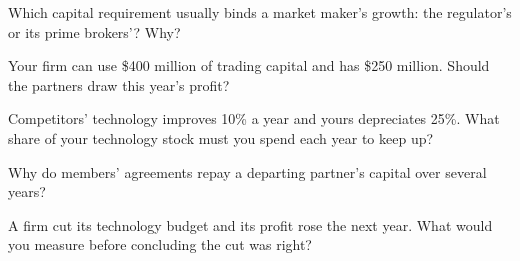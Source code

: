 \begin{interviewq}\label{iq:fm:the-proprietary-market-making-firm:2}
Which capital requirement usually binds a market maker's growth: the regulator's or its prime brokers'? Why?
\end{interviewq}

\begin{interviewq}\label{iq:fm:the-proprietary-market-making-firm:3}
Your firm can use \$400 million of trading capital and has \$250 million. Should the partners draw this year's profit?
\end{interviewq}

\begin{interviewq}\label{iq:fm:the-proprietary-market-making-firm:4}
Competitors' technology improves 10\% a year and yours depreciates 25\%. What share of your technology stock must you spend each year to keep up?
\end{interviewq}

\begin{interviewq}\label{iq:fm:the-proprietary-market-making-firm:5}
Why do members' agreements repay a departing partner's capital over several years?
\end{interviewq}

\begin{interviewq}\label{iq:fm:the-proprietary-market-making-firm:6}
A firm cut its technology budget and its profit rose the next year. What would you measure before concluding the cut was right?
\end{interviewq}
